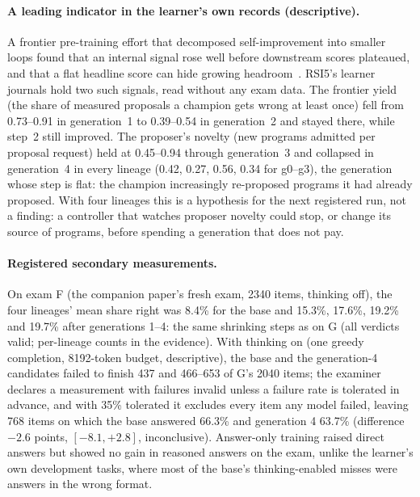 \paragraph{A leading indicator in the learner's own records (descriptive).} A frontier pre-training effort that decomposed
self-improvement into smaller loops found that an internal signal rose well before downstream scores plateaued, and that a
flat headline score can hide growing headroom~\cite{cai2026nosecondrun}. RSI5's learner journals hold two such signals, read
without any exam data. The frontier yield (the share of measured proposals a champion gets wrong at least once) fell from
0.73--0.91 in generation~1 to 0.39--0.54 in generation~2 and stayed there, while step~2 still improved. The proposer's novelty
(new programs admitted per proposal request) held at 0.45--0.94 through generation~3 and collapsed in generation~4 in every
lineage (0.42, 0.27, 0.56, 0.34 for g0--g3), the generation whose step is flat: the champion increasingly re-proposed programs it
had already proposed. With four lineages this is a hypothesis for the next registered run, not a finding: a controller that
watches proposer novelty could stop, or change its source of programs, before spending a generation that does not pay.

\paragraph{Registered secondary measurements.} On exam F (the companion paper's fresh exam, 2340 items, thinking off), the four
lineages' mean share right was 8.4\% for the base and 15.3\%, 17.6\%, 19.2\% and 19.7\% after generations 1--4: the same
shrinking steps as on G (all verdicts valid; per-lineage counts in the evidence). With thinking on (one greedy completion,
8192-token budget, descriptive), the base and the generation-4 candidates failed to finish 437 and 466--653 of G's 2040 items;
the examiner declares a measurement with failures invalid unless a failure rate is tolerated in advance, and with 35\% tolerated
it excludes every item any model failed, leaving 768 items on which the base answered 66.3\% and generation 4 63.7\%
(difference $-2.6$ points, $[-8.1, +2.8]$, inconclusive). Answer-only training raised direct answers but showed no gain in
reasoned answers on the exam, unlike the learner's own development tasks, where most of the base's thinking-enabled misses were
answers in the wrong format.
